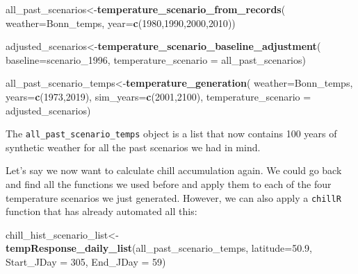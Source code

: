 \documentclass[
]{book}
\newenvironment{Shaded}{\begin{snugshade}}{\end{snugshade}}
\newcommand{\DataTypeTok}[1]{\textcolor[rgb]{0.13,0.29,0.53}{#1}}
\newcommand{\DecValTok}[1]{\textcolor[rgb]{0.00,0.00,0.81}{#1}}
\newcommand{\FloatTok}[1]{\textcolor[rgb]{0.00,0.00,0.81}{#1}}
\newcommand{\KeywordTok}[1]{\textcolor[rgb]{0.13,0.29,0.53}{\textbf{#1}}}
\newcommand{\NormalTok}[1]{#1}
\begin{document}
\begin{Shaded}
\begin{Highlighting}[]
\NormalTok{all_past_scenarios<-}\KeywordTok{temperature_scenario_from_records}\NormalTok{(}
  \DataTypeTok{weather=}\NormalTok{Bonn_temps,}
  \DataTypeTok{year=}\KeywordTok{c}\NormalTok{(}\DecValTok{1980}\NormalTok{,}\DecValTok{1990}\NormalTok{,}\DecValTok{2000}\NormalTok{,}\DecValTok{2010}\NormalTok{))}

\NormalTok{adjusted_scenarios<-}\KeywordTok{temperature_scenario_baseline_adjustment}\NormalTok{(}
  \DataTypeTok{baseline=}\NormalTok{scenario_}\DecValTok{1996}\NormalTok{,}
  \DataTypeTok{temperature_scenario =}\NormalTok{ all_past_scenarios)}

\NormalTok{all_past_scenario_temps<-}\KeywordTok{temperature_generation}\NormalTok{(}
  \DataTypeTok{weather=}\NormalTok{Bonn_temps,}
  \DataTypeTok{years=}\KeywordTok{c}\NormalTok{(}\DecValTok{1973}\NormalTok{,}\DecValTok{2019}\NormalTok{),}
  \DataTypeTok{sim_years=}\KeywordTok{c}\NormalTok{(}\DecValTok{2001}\NormalTok{,}\DecValTok{2100}\NormalTok{),}
  \DataTypeTok{temperature_scenario =}\NormalTok{ adjusted_scenarios)}
\end{Highlighting}
\end{Shaded}

The \texttt{all\_past\_scenario\_temps} object is a list that now contains 100 years of synthetic weather for all the past scenarios we had in mind.

Let's say we now want to calculate chill accumulation again. We could go back and find all the functions we used before and apply them to each of the four temperature scenarios we just generated. However, we can also apply a \texttt{chillR} function that has already automated all this:

\begin{Shaded}
\begin{Highlighting}[]
\NormalTok{chill_hist_scenario_list<-}\KeywordTok{tempResponse_daily_list}\NormalTok{(all_past_scenario_temps,}
                                                  \DataTypeTok{latitude=}\FloatTok{50.9}\NormalTok{,}
                                                  \DataTypeTok{Start_JDay =} \DecValTok{305}\NormalTok{,}
                                                  \DataTypeTok{End_JDay =} \DecValTok{59}\NormalTok{)}
\end{Highlighting}
\end{Shaded}
\end{document}

